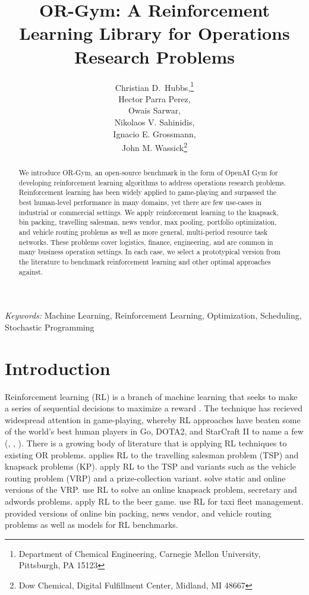 \documentclass[12pt]{article}
\title{OR-Gym: A Reinforcement Learning Library for Operations Research Problems}
\author{
	Christian D.~Hubbs,\thanks{Department of Chemical Engineering, Carnegie Mellon University, Pittsburgh, PA 15123} \\
	Hector Parra Perez,\footnotemark[1] \\
	Owais Sarwar,\footnotemark[1]\\
	Nikolaos V. Sahinidis,\footnotemark[1] \\
	Ignacio E. Grossmann,\footnotemark[1] \\
	John M. Wassick\thanks{Dow Chemical, Digital Fulfillment Center, Midland, MI 48667}
}
\providecommand{\keywords}[1]{\textit{Keywords:} #1}
\begin{document}
\maketitle

\begin{abstract}
We introduce OR-Gym, an open-source benchmark in the form of OpenAI Gym for developing reinforcement learning algorithms to address operations research problems.
Reinforcement learning has been widely applied to game-playing and surpassed the best human-level performance in many domains, yet there are few use-cases in industrial or commercial settings.
We apply reinforcement learning to the knapsack, bin packing, travelling salesman, news vendor, max pooling, portfolio optimization, and vehicle routing problems as well as more general, multi-period resource task networks. 
These problems cover logistics, finance, engineering, and are common in many business operation settings.
In each case, we select a prototypical version from the literature to benchmark reinforcement learning and other optimal approaches against. 
\end{abstract}

\keywords{Machine Learning, Reinforcement Learning, Optimization, Scheduling, Stochastic Programming}

\section{Introduction}

Reinforcement learning (RL) is a branch of machine learning that seeks to make a series of sequential decisions to maximize a reward \citep{Sutton2018}.
The technique has recieved widespread attention in game-playing, whereby RL approaches have beaten some of the world's best human players in Go, DOTA2, and StarCraft II to name a few (\citet{Silver2017}, \citet{Berner2019a}, \citet{Vinyals2019}). 
There is a growing body of literature that is applying RL techniques to existing OR problems.
\citet{Bello2019} applies RL to the travelling salesman problem (TSP) and knapsack problems (KP). 
\citet{Kool2019} apply RL to the TSP and variants such as the vehicle routing problem (VRP) and a prize-collection variant. 
\citet{Nazari2018} solve static and online versions of the VRP.
\citet{Kong2019} use RL to solve an online knapsack problem, secretary and adwords problems.
\citet{Oroojlooyjadid2017} apply RL to the beer game.
\citet{Lin2018} use RL for taxi fleet management. 
\citet{Balaji2019} provided versions of online bin packing, news vendor, and vehicle routing problems as well as models for RL benchmarks.
\end{document}
